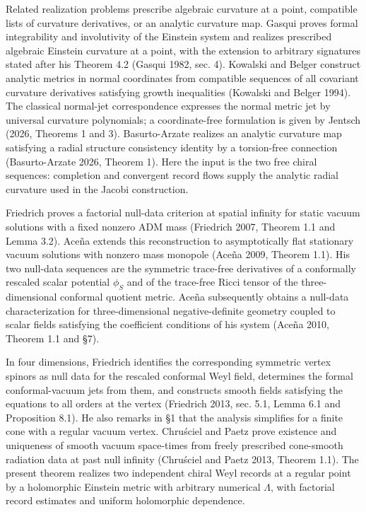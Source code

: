 \documentclass[
  english,
  11pt,
  reqno]{amsart}
\begin{document}
Related realization problems prescribe algebraic curvature at a point,
compatible lists of curvature derivatives, or an analytic curvature map.
Gasqui proves formal integrability and involutivity of the Einstein
system and realizes prescribed algebraic Einstein curvature at a point,
with the extension to arbitrary signatures stated after his Theorem 4.2
(Gasqui 1982, sec. 4). Kowalski and Belger construct analytic metrics in
normal coordinates from compatible sequences of all covariant curvature
derivatives satisfying growth inequalities (Kowalski and Belger 1994).
The classical normal-jet correspondence expresses the normal metric jet
by universal curvature polynomials; a coordinate-free formulation is
given by Jentsch (2026, Theorems 1 and 3). Basurto-Arzate realizes an
analytic curvature map satisfying a radial structure consistency
identity by a torsion-free connection (Basurto-Arzate 2026, Theorem 1).
Here the input is the two free chiral sequences: completion and
convergent record flows supply the analytic radial curvature used in the
Jacobi construction.

Friedrich proves a factorial null-data criterion at spatial infinity for
static vacuum solutions with a fixed nonzero ADM mass (Friedrich 2007,
Theorem 1.1 and Lemma 3.2). Aceña extends this reconstruction to
asymptotically flat stationary vacuum solutions with nonzero mass
monopole (Aceña 2009, Theorem 1.1). His two null-data sequences are the
symmetric trace-free derivatives of a conformally rescaled scalar
potential \(\phi_S\) and of the trace-free Ricci tensor of the
three-dimensional conformal quotient metric. Aceña subsequently obtains
a null-data characterization for three-dimensional negative-definite
geometry coupled to scalar fields satisfying the coefficient conditions
of his system (Aceña 2010, Theorem 1.1 and §7).

In four dimensions, Friedrich identifies the corresponding symmetric
vertex spinors as null data for the rescaled conformal Weyl field,
determines the formal conformal-vacuum jets from them, and constructs
smooth fields satisfying the equations to all orders at the vertex
(Friedrich 2013, sec. 5.1, Lemma 6.1 and Proposition 8.1). He also
remarks in §1 that the analysis simplifies for a finite cone with a
regular vacuum vertex. Chruściel and Paetz prove existence and
uniqueness of smooth vacuum space-times from freely prescribed
cone-smooth radiation data at past null infinity (Chruściel and Paetz
2013, Theorem 1.1). The present theorem realizes two independent chiral
Weyl records at a regular point by a holomorphic Einstein metric with
arbitrary numerical \(\Lambda\), with factorial record estimates and
uniform holomorphic dependence.
\end{document}
